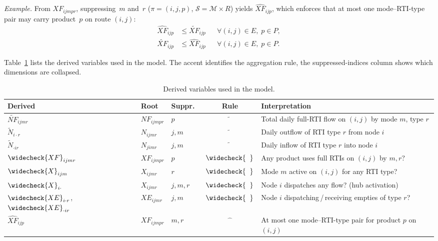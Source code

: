 \begin{convention}
\smallskip\noindent\textit{Example.}
From $XF_{ijmpr}$, suppressing~$m$ and~$r$
($\pi=(i,j,p)$, $\mathcal{S}=\mathcal{M}\times R$)
yields $\widehat{XF}_{ijp}$, which enforces that at most one
mode--RTI-type pair may carry product~$p$ on route $(i,j)$:
\begin{align}
  \widehat{XF}_{ijp}
    &\leq \widetilde{XF}_{ijp}
    && \forall (i,j)\in E,\;p\in P,
    \label{eq:amo-ex-lb} \\
  \widetilde{XF}_{ijp}
    &\leq \widehat{XF}_{ijp}
    && \forall (i,j)\in E,\;p\in P.
    \label{eq:amo-ex-ub}
\end{align}

\end{convention}


Table~\ref{tab:notation-examples} lists the derived variables used in
the model. The accent identifies the aggregation rule,
the suppressed-indices column shows which dimensions are collapsed.

\begin{table}[ht]
\centering
\caption{Derived variables used in the model.}
\label{tab:notation-examples}
\small
\begin{tabular}{@{}lllcl@{}}
\toprule
Derived & Root & Suppr.\ & Rule & Interpretation \\
\midrule
$\widetilde{NF}_{ijmr}$
  & $NF_{ijmpr}$ & $p$
  & $\widetilde{\phantom{x}}$
  & Total daily full-RTI flow on $(i,j)$ by mode $m$, type $r$ \\[3pt]
$\widetilde{N}_{i\cdot r}$
  & $N_{ijmr}$ & $j,m$
  & $\widetilde{\phantom{x}}$
  & Daily outflow of RTI type $r$ from node $i$ \\[3pt]
$\widetilde{N}_{\cdot ir}$
  & $N_{jimr}$ & $j,m$
  & $\widetilde{\phantom{x}}$
  & Daily inflow of RTI type $r$ into node $i$ \\[3pt]
$\widecheck{XF}_{ijmr}$
  & $XF_{ijmpr}$ & $p$
  & $\widecheck{\phantom{x}}$
  & Any product uses full RTIs on $(i,j)$ by $m,r$? \\[3pt]
$\widecheck{X}_{ijm}$
  & $X_{ijmr}$ & $r$
  & $\widecheck{\phantom{x}}$
  & Mode $m$ active on $(i,j)$ for any RTI type? \\[3pt]
$\widecheck{X}_{i\cdot}$
  & $X_{ijmr}$ & $j,m,r$
  & $\widecheck{\phantom{x}}$
  & Node $i$ dispatches any flow? (hub activation) \\[3pt]
$\widecheck{XE}_{i\cdot r}$,\;
$\widecheck{XE}_{\cdot ir}$
  & $XE_{ijmr}$ & $j,m$
  & $\widecheck{\phantom{x}}$
  & Node $i$ dispatching\,/\,receiving empties of type $r$? \\[3pt]
$\widehat{XF}_{ijp}$
  & $XF_{ijmpr}$ & $m,r$
  & $\widehat{\phantom{x}}$
  & At most one mode--RTI-type pair for product $p$ on $(i,j)$ \\
\bottomrule
\end{tabular}
\end{table}

